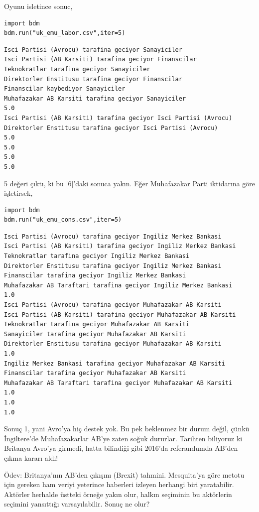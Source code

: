 \documentclass[12pt,fleqn]{article}\usepackage{../../common}
\begin{document}
Oyunu isletince sonuc,

\begin{verbatim}
import bdm
bdm.run("uk_emu_labor.csv",iter=5)
\end{verbatim}

\begin{verbatim}
Isci Partisi (Avrocu) tarafina geciyor Sanayiciler
Isci Partisi (AB Karsiti) tarafina geciyor Finanscilar
Teknokratlar tarafina geciyor Sanayiciler
Direktorler Enstitusu tarafina geciyor Finanscilar
Finanscilar kaybediyor Sanayiciler
Muhafazakar AB Karsiti tarafina geciyor Sanayiciler
5.0
Isci Partisi (AB Karsiti) tarafina geciyor Isci Partisi (Avrocu)
Direktorler Enstitusu tarafina geciyor Isci Partisi (Avrocu)
5.0
5.0
5.0
5.0
\end{verbatim}

5 değeri çıktı, ki bu [6]'daki sonuca yakın. Eğer Muhafazakar Parti iktidarına
göre işletirsek,

\begin{verbatim}
import bdm
bdm.run("uk_emu_cons.csv",iter=5)
\end{verbatim}

\begin{verbatim}
Isci Partisi (Avrocu) tarafina geciyor Ingiliz Merkez Bankasi
Isci Partisi (AB Karsiti) tarafina geciyor Ingiliz Merkez Bankasi
Teknokratlar tarafina geciyor Ingiliz Merkez Bankasi
Direktorler Enstitusu tarafina geciyor Ingiliz Merkez Bankasi
Finanscilar tarafina geciyor Ingiliz Merkez Bankasi
Muhafazakar AB Taraftari tarafina geciyor Ingiliz Merkez Bankasi
1.0
Isci Partisi (Avrocu) tarafina geciyor Muhafazakar AB Karsiti
Isci Partisi (AB Karsiti) tarafina geciyor Muhafazakar AB Karsiti
Teknokratlar tarafina geciyor Muhafazakar AB Karsiti
Sanayiciler tarafina geciyor Muhafazakar AB Karsiti
Direktorler Enstitusu tarafina geciyor Muhafazakar AB Karsiti
1.0
Ingiliz Merkez Bankasi tarafina geciyor Muhafazakar AB Karsiti
Finanscilar tarafina geciyor Muhafazakar AB Karsiti
Muhafazakar AB Taraftari tarafina geciyor Muhafazakar AB Karsiti
1.0
1.0
1.0
\end{verbatim}

Sonuç 1, yani Avro'ya hiç destek yok. Bu pek beklenmez bir durum değil, çünkü
İngiltere'de Muhafazakarlar AB'ye zaten soğuk dururlar. Tarihten biliyoruz ki
Britanya Avro'ya girmedi, hatta bilindiği gibi 2016'da referandumda AB'den çıkma
kararı aldı!

Ödev: Britanya'nın AB'den çıkışını (Brexit) tahmini.  Mesquita'ya göre metotu
için gereken ham veriyi yeterince haberleri izleyen herhangi biri
yaratabilir. Aktörler herhalde üstteki örneğe yakın olur, halkın seçiminin bu
aktörlerin seçimini yansıttığı varsayılabilir. Sonuç ne olur?
\end{document}
